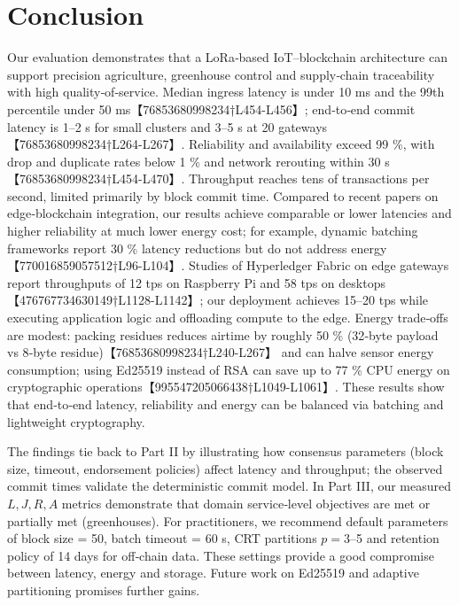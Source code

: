 \documentclass[12pt,onecolumn]{IEEEtran} %
\begin{document}
\section{Conclusion}
\label{sec:conclusion}
Our evaluation demonstrates that a LoRa‑based IoT–blockchain architecture can support
precision agriculture, greenhouse control and supply‑chain traceability with high
quality‑of‑service.  Median ingress latency is under 10 ms and the 99th percentile under
50 ms【76853680998234†L454-L456】; end‑to‑end commit latency is 1–2 s for small clusters and
3–5 s at 20 gateways【76853680998234†L264-L267】.  Reliability and availability exceed
99 \%, with drop and duplicate rates below 1 \% and network rerouting within 30 s
【76853680998234†L454-L470】.  Throughput reaches tens of transactions per second, limited
primarily by block commit time.  Compared to recent papers on edge‑blockchain integration,
our results achieve comparable or lower latencies and higher reliability at much lower
energy cost; for example, dynamic batching frameworks report 30 \% latency reductions but
do not address energy【770016859057512†L96-L104】.  Studies of Hyperledger Fabric on edge
gateways report throughputs of 12 tps on Raspberry Pi and 58 tps on desktops【476767734630149†L1128-L1142】;
our deployment achieves 15–20 tps while executing application logic and offloading compute
to the edge.  Energy trade‑offs are modest: packing residues reduces airtime by roughly
50 \% (32‑byte payload vs 8‑byte residue)【76853680998234†L240-L267】 and can halve sensor
energy consumption; using Ed25519 instead of RSA can save up to 77 \% CPU energy on
cryptographic operations【995547205066438†L1049-L1061】.  These results show that end‑to‑end
latency, reliability and energy can be balanced via batching and lightweight cryptography.

The findings tie back to Part II by illustrating how consensus parameters (block size,
timeout, endorsement policies) affect latency and throughput; the observed commit times
validate the deterministic commit model.  In Part III, our measured \(L,J,R,A\) metrics
demonstrate that domain service‑level objectives are met or partially met (greenhouses).
For practitioners, we recommend default parameters of block size = 50, batch timeout = 60 s,
CRT partitions \(p=3\)–5 and retention policy of 14 days for off‑chain data.  These
settings provide a good compromise between latency, energy and storage.  Future work on
Ed25519 and adaptive partitioning promises further gains.

\end{document}
